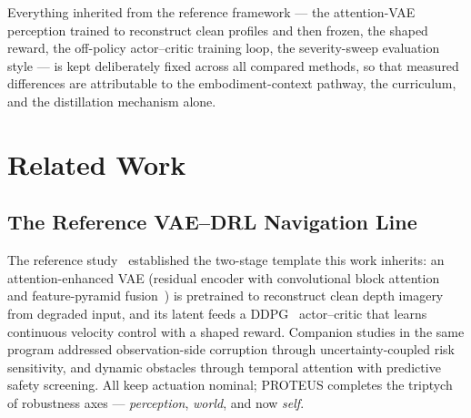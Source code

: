 \documentclass[journal]{IEEEtran}
\begin{document}
Everything inherited from the reference framework --- the attention-VAE
perception trained to reconstruct clean profiles and then frozen, the shaped
reward, the off-policy actor--critic training loop, the severity-sweep
evaluation style --- is kept deliberately fixed across all compared methods,
so that measured differences are attributable to the embodiment-context
pathway, the curriculum, and the distillation mechanism alone.

\section{Related Work}
\subsection{The Reference VAE--DRL Navigation Line}
The reference study~\cite{Lee2026VAEDDPG} established the two-stage template
this work inherits: an attention-enhanced VAE (residual encoder with
convolutional block attention~\cite{Woo2018CBAM} and feature-pyramid
fusion~\cite{Lin2017FPN}) is pretrained to reconstruct clean depth imagery
from degraded input, and its latent feeds a DDPG~\cite{Lillicrap2016DDPG}
actor--critic that learns continuous velocity control with a shaped reward.
Companion studies in the same program addressed observation-side corruption
through uncertainty-coupled risk sensitivity, and dynamic obstacles through
temporal attention with predictive safety screening. All keep actuation
nominal; PROTEUS completes the triptych of robustness axes ---
\emph{perception}, \emph{world}, and now \emph{self}.
\end{document}

